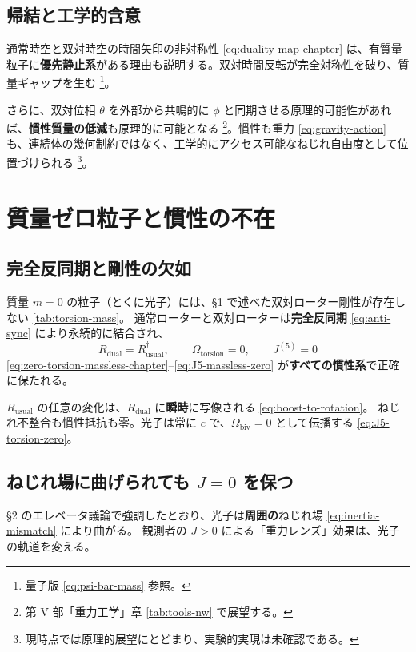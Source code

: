 \documentclass[dvipdfmx,a4paper,oneside]{jsbook}
\numberwithin{equation}{chapter}
\begin{document}
\subsection{帰結と工学的含意}

通常時空と双対時空の時間矢印の非対称性 \eqref{eq:duality-map-chapter} は、有質量粒子に\textbf{優先静止系}がある理由も説明する。双対時間反転が完全対称性を破り、質量ギャップを生む \footnote{量子版 \eqref{eq:psi-bar-mass} 参照。}。

さらに、双対位相 \(\theta\) を外部から共鳴的に \(\phi\) と同期させる原理的可能性があれば、\textbf{慣性質量の低減}も原理的に可能となる \footnote{第 V 部「重力工学」章 \eqref{tab:tools-nw} で展望する。}。慣性も重力 \eqref{eq:gravity-action} も、連続体の幾何制約ではなく、工学的にアクセス可能なねじれ自由度として位置づけられる \footnote{現時点では原理的展望にとどまり、実験的実現は未確認である。}。

\section{質量ゼロ粒子と慣性の不在}

\subsection{完全反同期と剛性の欠如}

質量 \(m = 0\) の粒子（とくに光子）には、§1 で述べた双対ローター剛性が存在しない \eqref{tab:torsion-mass}。
通常ローターと双対ローターは\textbf{完全反同期} \eqref{eq:anti-sync} により永続的に結合され、
\begin{equation}
  R_{\mathrm{dual}} = R_{\mathrm{usual}}^\dagger,
  \qquad
  \Omega_{\mathrm{torsion}} = 0,
  \qquad
  J^{(5)} = 0
  \label{eq:inertia-massless-sync}
\end{equation}
\eqref{eq:zero-torsion-massless-chapter}–\eqref{eq:J5-massless-zero} が\textbf{すべての慣性系}で正確に保たれる。

\(R_{\mathrm{usual}}\) の任意の変化は、\(R_{\mathrm{dual}}\) に\textbf{瞬時}に写像される \eqref{eq:boost-to-rotation}。
ねじれ不整合も慣性抵抗も零。光子は常に \(c\) で、\(\Omega_{\mathrm{biv}} = 0\) として伝播する \eqref{eq:J5-torsion-zero}。

\subsection{ねじれ場に曲げられても \(J = 0\) を保つ}

§2 のエレベータ議論で強調したとおり、光子は\textbf{周囲の}ねじれ場 \eqref{eq:inertia-mismatch} により曲がる。
観測者の \(J > 0\) による「重力レンズ」効果は、光子の軌道を変える。
\end{document}
